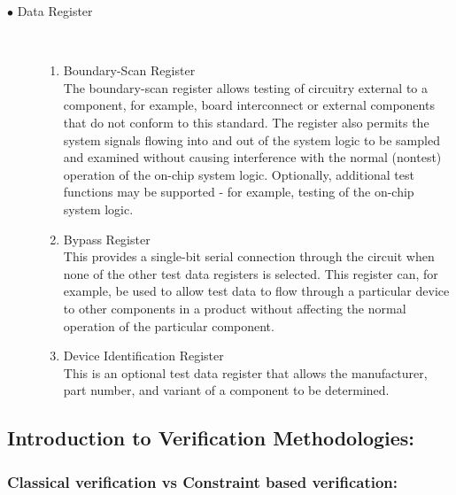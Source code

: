 \documentclass[a4paper,11pt]{article}
\begin{document}
\begin{description}
\begin{center}
\begin{table}[!h]
\begin{tabular}{|c|c|c|c|}
\end{tabular}
\end{table}
\end{center}

\FloatBarrier
\item [$\bullet$ Data Register]
\  \\

\begin{enumerate}[I]%
\item Boundary-Scan Register
\ \\
The boundary-scan register allows testing of circuitry external to a component, for example, board interconnect or external components that do not conform to this standard. The register also permits the system signals flowing into and out of the system logic to be sampled and examined without causing interference with the normal (nontest) operation of the on-chip system logic. Optionally, additional test functions may be supported - for example, testing of the on-chip system logic.

\item Bypass Register
\ \\
This provides a single-bit serial connection through the circuit when none of the other test data registers is selected. This register can, for example, be used to allow test data to flow through a particular device to other components in a product without affecting the normal operation of the particular component. 

\item Device Identification Register
\ \\
This is an optional test data register that allows the manufacturer, part number, and variant of a component to be determined.

\end{enumerate} 

\end{description}


\newpage
\pagebreak
\subsection{Introduction to Verification Methodologies:}


\subsubsection{Classical verification vs Constraint based verification:}
\end{document}
